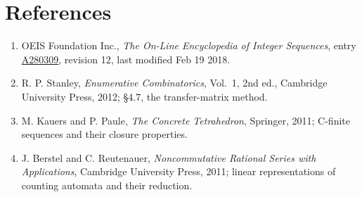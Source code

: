 \documentclass[11pt]{article}
\theoremstyle{definition}
\begin{document}
\section{References}

\begin{enumerate}

\item OEIS Foundation Inc., \emph{The On-Line Encyclopedia of Integer Sequences}, entry \href{https://oeis.org/A280309}{A280309}, revision 12, last modified Feb 19 2018.

\item R. P. Stanley, \emph{Enumerative Combinatorics}, Vol.~1, 2nd ed., Cambridge University Press, 2012; \S4.7, the transfer-matrix method.

\item M. Kauers and P. Paule, \emph{The Concrete Tetrahedron}, Springer, 2011; C-finite sequences and their closure properties.

\item J. Berstel and C. Reutenauer, \emph{Noncommutative Rational Series with Applications}, Cambridge University Press, 2011; linear representations of counting automata and their reduction.

\end{enumerate}
\end{document}
